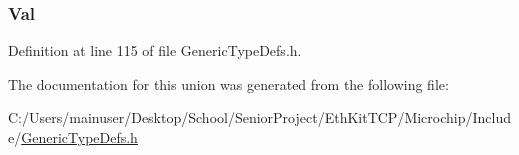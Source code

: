 \subsubsection[{Val}]{ Val}\label{union_u_i_n_t16___v_a_l_a39422387a9d2651da86ce4437ee8b5ab}


Definition at line 115 of file Generic\+Type\+Defs.\+h.



The documentation for this union was generated from the following file\+:\begin{DoxyCompactItemize}
\item 
C\+:/\+Users/mainuser/\+Desktop/\+School/\+Senior\+Project/\+Eth\+Kit\+T\+C\+P/\+Microchip/\+Include/\hyperlink{_generic_type_defs_8h}{Generic\+Type\+Defs.\+h}\end{DoxyCompactItemize}
